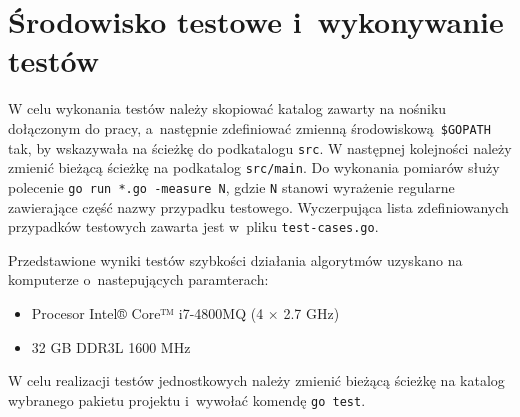 \section{Środowisko testowe i~wykonywanie testów}
\par{
  W celu wykonania testów należy skopiować katalog zawarty na nośniku dołączonym do pracy, a~następnie zdefiniować zmienną środowiskową \texttt{\$GOPATH} tak, by wskazywała na ścieżkę do podkatalogu \texttt{src}.
  W następnej kolejności należy zmienić bieżącą ścieżkę na podkatalog \texttt{src/main}.
  Do wykonania pomiarów służy polecenie \texttt{go run *.go -measure N}, gdzie \texttt{N} stanowi wyrażenie regularne zawierające część nazwy przypadku testowego.
  Wyczerpująca lista zdefiniowanych przypadków testowych zawarta jest w~pliku \texttt{test-cases.go}.

  Przedstawione wyniki testów szybkości działania algorytmów uzyskano na komputerze o~nastepujących paramterach:
  \begin{itemize}
    \item Procesor Intel® Core™ i7-4800MQ (4 $\times$ 2.7 GHz)
    \item 32 GB DDR3L 1600 MHz
  \end{itemize}


  W celu realizacji testów jednostkowych należy zmienić bieżącą ścieżkę na katalog wybranego pakietu projektu i~wywołać komendę \texttt{go test}.
}
